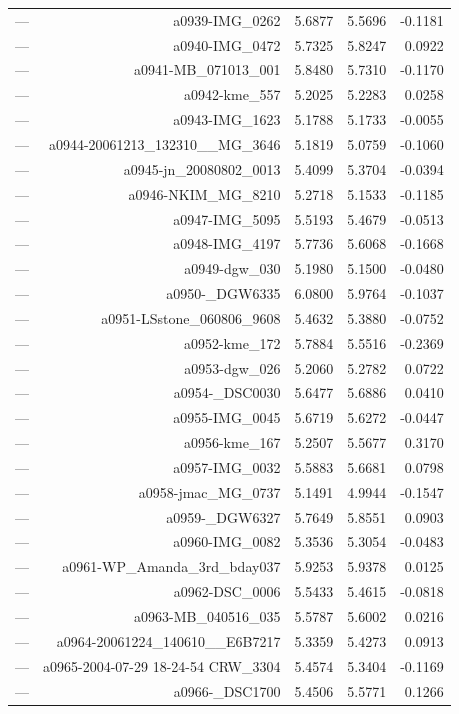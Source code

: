 \begin{table}[htbp]
\begin{tabular}{lrrrr}
— & a0939-IMG_0262 & 5.6877 & 5.5696 & -0.1181 \\
— & a0940-IMG_0472 & 5.7325 & 5.8247 & 0.0922 \\
— & a0941-MB_071013_001 & 5.8480 & 5.7310 & -0.1170 \\
— & a0942-kme_557 & 5.2025 & 5.2283 & 0.0258 \\
— & a0943-IMG_1623 & 5.1788 & 5.1733 & -0.0055 \\
— & a0944-20061213_132310__MG_3646 & 5.1819 & 5.0759 & -0.1060 \\
— & a0945-jn_20080802_0013 & 5.4099 & 5.3704 & -0.0394 \\
— & a0946-NKIM_MG_8210 & 5.2718 & 5.1533 & -0.1185 \\
— & a0947-IMG_5095 & 5.5193 & 5.4679 & -0.0513 \\
— & a0948-IMG_4197 & 5.7736 & 5.6068 & -0.1668 \\
— & a0949-dgw_030 & 5.1980 & 5.1500 & -0.0480 \\
— & a0950-_DGW6335 & 6.0800 & 5.9764 & -0.1037 \\
— & a0951-LSstone_060806_9608 & 5.4632 & 5.3880 & -0.0752 \\
— & a0952-kme_172 & 5.7884 & 5.5516 & -0.2369 \\
— & a0953-dgw_026 & 5.2060 & 5.2782 & 0.0722 \\
— & a0954-_DSC0030 & 5.6477 & 5.6886 & 0.0410 \\
— & a0955-IMG_0045 & 5.6719 & 5.6272 & -0.0447 \\
— & a0956-kme_167 & 5.2507 & 5.5677 & 0.3170 \\
— & a0957-IMG_0032 & 5.5883 & 5.6681 & 0.0798 \\
— & a0958-jmac_MG_0737 & 5.1491 & 4.9944 & -0.1547 \\
— & a0959-_DGW6327 & 5.7649 & 5.8551 & 0.0903 \\
— & a0960-IMG_0082 & 5.3536 & 5.3054 & -0.0483 \\
— & a0961-WP_Amanda_3rd_bday037 & 5.9253 & 5.9378 & 0.0125 \\
— & a0962-DSC_0006 & 5.5433 & 5.4615 & -0.0818 \\
— & a0963-MB_040516_035 & 5.5787 & 5.6002 & 0.0216 \\
— & a0964-20061224_140610__E6B7217 & 5.3359 & 5.4273 & 0.0913 \\
— & a0965-2004-07-29 18-24-54 CRW_3304 & 5.4574 & 5.3404 & -0.1169 \\
— & a0966-_DSC1700 & 5.4506 & 5.5771 & 0.1266 \\

\end{tabular}
\end{table}
